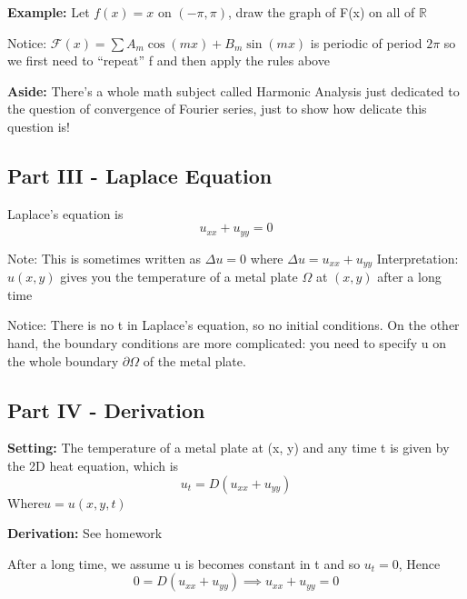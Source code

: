 \documentclass[12pt]{article}
\newcommand{\F}{\mathcal{F}}
\begin{document}
\textbf{Example: } Let $f(x) = x$ on $(-\pi, \pi)$, draw the graph of F(x) on all of $\mathbb{R}$

Notice: $\F(x) = \sum A_m \cos(mx) + B_m \sin(mx)$ is periodic of period $2\pi$ so we first need to “repeat” f and then apply the rules above

\textbf{Aside:} There's a whole math subject called Harmonic Analysis just dedicated to the question of convergence of Fourier series, just to show how delicate this question is!

\subsection*{Part III - Laplace Equation}
Laplace's equation is 
\[\boxed{u_{xx} + u_{yy} = 0}\]

Note: This is sometimes written as $\Delta u = 0$ where $\Delta u = u_{xx} + u_{yy}$
Interpretation: $u(x, y)$ gives you the temperature of a metal plate $\Omega$ at $(x, y)$ after a long time

Notice: There is no t in Laplace's equation, so no initial conditions. On the other hand, the boundary conditions are more complicated: you need to specify u on the whole boundary $\partial \Omega$ of the metal plate.

\subsection*{Part IV - Derivation}
\textbf{Setting:} The temperature of a metal plate at (x, y) and any time t is given by the 2D heat equation, which is
\[u_t = D (u_{xx} + u_{yy})\]  
Where$ u = u(x, y, t)$

\textbf{Derivation:} See homework 

After a long time, we assume u is becomes constant in t and so $u_t = 0$, Hence 
\[0 = D (u_{xx} + u_{yy}) \implies u_{xx} + u_{yy} = 0\]
\end{document}
